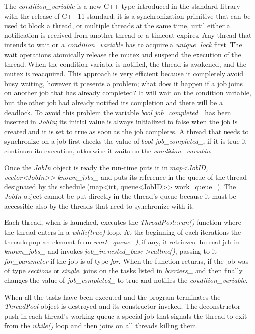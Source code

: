 \documentclass[a4paper,11pt,oneside]{book}
\begin{document}
The \emph{condition\_variable} is a new C++ type introduced in the standard library with the release of C++11 standard; it is a synchronization primitive that can be used to block a thread, or multiple threads at the same time, until either a notification is received from another thread or a timeout expires. Any thread that intends to wait on a \emph{condition\_variable} has to acquire a \emph{unique\_lock} first. The wait operations atomically release the mutex and suspend the execution of the thread. When the condition variable is notified, the thread is awakened, and the mutex is reacquired. This approach is very efficient because it completely avoid busy waiting, however it presents a problem; what does it happen if a job joins on another job that has already completed? It will wait on the condition variable, but the other job had already notified its completion and there will be a deadlock. To avoid this problem the variable \emph{bool job\_completed\_} has been inserted in \emph{JobIn}; its initial value is always initialized to false when the job is created and it is set to true as soon as the job completes. A thread that needs to synchronize on a job first checks the value of \emph{bool job\_completed\_}, if it is true it continues its execution, otherwise it waits on the \emph{condition\_variable}.

Once the \emph{JobIn} object is ready the run-time puts it in \emph{map<JobID, vector<JobIn>> known\_jobs\_} and puts its reference in the queue of the thread designated by the schedule (map<int, queue<JobID>> work\_queue\_). The \emph{JobIn} object cannot be put directly in the thread’s queue because it must be accessible also by the threads that need to synchronize with it. 

Each thread, when is launched, executes the \emph{ThreadPool::run()} function where the thread enters in a \emph{while(true)} loop. At the beginning of each iterations the threads pop an element from \emph{work\_queue\_)}, if any, it retrieves the real job in \emph{known\_jobs\_} and invokes \emph{job\_in.nested\_base->callme()}, passing to it \emph{for\_parameter} if the job is of type \emph{for}. When the function returns, if the job was of type \emph{sections} or \emph{single}, joins on the tasks listed in \emph{barriers\_} and then finally changes the value of \emph{job\_completed\_} to true and notifies the \emph{condition\_variable}.

When all the tasks have been executed and the program terminates the \emph{ThreadPool} object is destroyed and its constructor invoked. The deconstructor push in each thread’s working queue a special job that signals the thread to exit from the \emph{while()} loop and then joins on all threads killing them.
\end{document}
